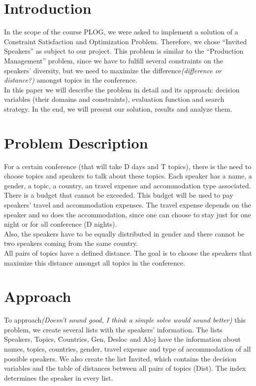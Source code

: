 \documentclass[runningheads,a4paper]{llncs}
\begin{document}
\section{Introduction}

In the scope of the course PLOG, we were asked to implement a solution of a Constraint Satisfaction and Optimization Problem. Therefore, we chose “Invited Speakers” as subject to our project. This problem is similar to the “Production Management” problem, since we have to fulfill several constraints on the speakers’ diversity, but we need to maximize the difference\textit{(difference or distance?)} amongst topics in the conference.\\
In this paper we will describe the problem in detail and its approach: decision variables (their domains and constraints), evaluation function and search strategy. In the end, we will present our solution, results and analyze them.


\section{Problem Description}

For a certain conference (that will take D days and T topics), there is the need to choose topics and speakers to talk about these topics. Each speaker has a name, a gender, a topic, a country, an travel expense and accommodation type associated.\\
There is a budget that cannot be exceeded. This budget will be used to pay speakers’ travel and accommodation expenses. The travel expense depends on the speaker and so does the accommodation, since one can choose to stay just for one night or for all conference (D nights).\\
Also, the speakers have to be equally distributed in gender and there cannot be two speakers coming from the same country. \\
All pairs of topics have a defined distance. The goal is to choose the speakers that maximize this distance amongst all topics in the conference.

\section{Approach}

To approach\textit{(Doesn't sound good, I think a simple solve would sound better)} this problem, we create several lists with the speakers’ information. The lists Speakers, Topics, Countries, Gen, Desloc and Aloj have the information about names, topics, countries, gender, travel expense and type of accommodation of all possible speakers. We also create the list Invited, which contains the decision variables and the table of distances between all pairs of topics (Dist). The index determines the speaker in every list.
\end{document}
